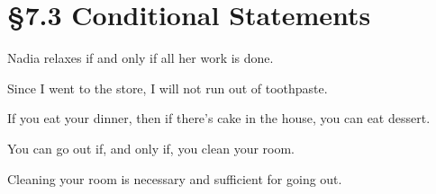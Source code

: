 % 
% 

\section{\S 7.3 Conditional Statements}
\begin{enumerate}

\begin{statement}{Nadia relaxes if and only if all her work is done.}
\end{statement}

\begin{statement}{Since I went to the store, I will not run out of toothpaste.}
\end{statement}

\begin{statement}{If you eat your dinner, then if there’s cake in the house, you can eat dessert.}
\end{statement}

\begin{statement}{You can go out if, and only if, you clean your room.}
\end{statement}

\begin{statement}{Cleaning your room is necessary and sufficient for going out.}
\end{statement}


\end{enumerate}
% 
